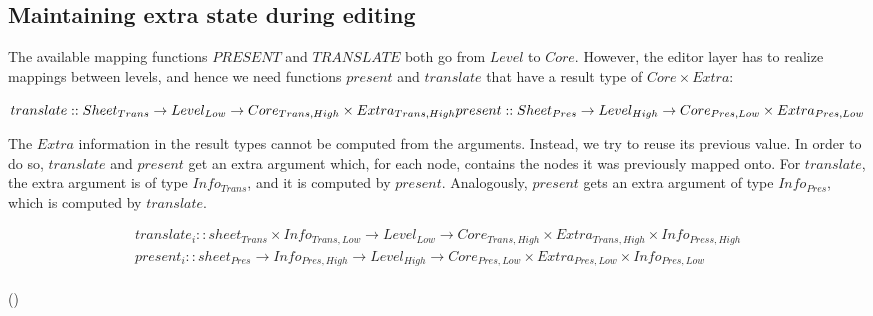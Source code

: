 %																
\subsection{Maintaining extra state during editing} \label{sect:maintainingExtraState}


The available mapping functions $PRESENT$ and $TRANSLATE$ both go from $Level$ to $Core$. However, the editor layer has to realize mappings between levels, and hence we need functions $present$ and $translate$ that have a result type of $Core \times Extra$:

\begin{math}
translate :: Sheet_{Trans} \rightarrow Level_{Low} \rightarrow Core_{Trans,High}  \times Extra_{Trans,High} \\
present :: Sheet_{Pres} \rightarrow Level_{High} \rightarrow Core_{Pres,Low} \times Extra_{Pres,Low} \\
\end{math}

The $Extra$ information in the result types cannot be computed from the arguments. Instead, we try to reuse its previous value. In order to do so, $translate$ and $present$ get an extra argument which, for each node, contains the nodes it was previously mapped onto. For $translate$, the extra argument is of type $Info_{Trans}$, and it is computed by $present$. Analogously, $present$ gets an extra argument of type $Info_{Pres}$, which is computed by $translate$. 

\begin{small}\begin{align*}
translate_{i} :: sheet_{Trans} \times Info_{Trans,Low} \rightarrow Level_{Low} \rightarrow Core_{Trans,High}  \times Extra_{Trans,High}  \times Info_{Press,High}\\
present_{i} :: sheet_{Pres}  \rightarrow Info_{Pres,High} \rightarrow  Level_{High} \rightarrow Core_{Pres,Low} \times Extra_{Pres,Low}   \times Info_{Pres,Low} \\
\end{align*} 
\end{small}
{\centering ()\\}


